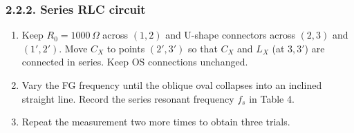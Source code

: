 \documentclass[12pt,oneside,a4paper]{article}
\theoremstyle{definition}
\begin{document}
	\subsubsection*{2.2.2. Series RLC circuit}
	\begin{enumerate}[leftmargin=1.5em]
		\item Keep $R_0 = 1000\,\Omega$ across $(1,2)$ and U-shape connectors across $(2,3)$ and $(1',2')$. Move $C_X$ to points $(2',3')$ so that $C_X$ and $L_X$ (at $3,3'$) are connected in series. Keep OS connections unchanged.
		\item Vary the FG frequency until the oblique oval collapses into an inclined straight line. Record the series resonant frequency $f_s$ in Table 4.
		\item Repeat the measurement two more times to obtain three trials.
	\end{enumerate}
\end{document}
